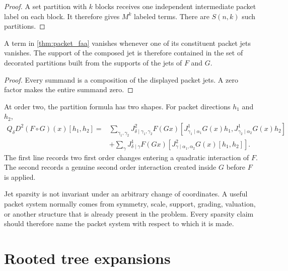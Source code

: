\begin{proof}
A set partition with $k$ blocks receives one independent intermediate packet label on each block.  It therefore gives $M^k$ labeled terms.  There are $S(n,k)$ such partitions.
\end{proof}

\begin{corollary}\label{cor:structural_pruning}
A term in \cref{thm:packet_faa} vanishes whenever one of its constituent packet jets vanishes.  The support of the composed jet is therefore contained in the set of decorated partitions built from the supports of the jets of $F$ and $G$.
\end{corollary}

\begin{proof}
Every summand is a composition of the displayed packet jets.  A zero factor makes the entire summand zero.
\end{proof}


\begin{example}\label{ex:second_order_composition}
At order two, the partition formula has two shapes.  For packet directions $h_1$ and $h_2$,
\[
\begin{aligned}
Q_\delta D^2(F\circ G)(x)[h_1,h_2]
={}&
\sum_{\gamma_1,\gamma_2}
J^2_{\delta\mid\gamma_1,\gamma_2}F(Gx)
[J^1_{\gamma_1\mid\alpha_1}G(x)h_1,J^1_{\gamma_2\mid\alpha_2}G(x)h_2]\\
&+
\sum_\gamma
J^1_{\delta\mid\gamma}F(Gx)
[J^2_{\gamma\mid\alpha_1,\alpha_2}G(x)[h_1,h_2]].
\end{aligned}
\]
The first line records two first order changes entering a quadratic interaction of $F$.  The second records a genuine second order interaction created inside $G$ before $F$ is applied.
\end{example}

\begin{remark}\label{rem:jet_coordinate_dependence}
Jet sparsity is not invariant under an arbitrary change of coordinates.  A useful packet system normally comes from symmetry, scale, support, grading, valuation, or another structure that is already present in the problem.  Every sparsity claim should therefore name the packet system with respect to which it is made.
\end{remark}

\section{Rooted tree expansions}\label{sec:trees}

